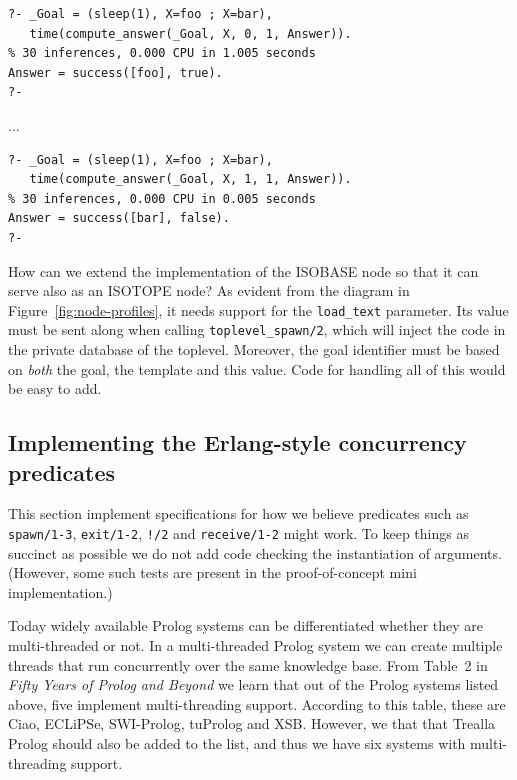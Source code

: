 \begin{verbatim}
?- _Goal = (sleep(1), X=foo ; X=bar),
   time(compute_answer(_Goal, X, 0, 1, Answer)).
% 30 inferences, 0.000 CPU in 1.005 seconds
Answer = success([foo], true).
?-
\end{verbatim}

\noindent ...

\begin{verbatim}
?- _Goal = (sleep(1), X=foo ; X=bar),
   time(compute_answer(_Goal, X, 1, 1, Answer)).
% 30 inferences, 0.000 CPU in 0.005 seconds
Answer = success([bar], false).
?-
\end{verbatim}


\noindent How can we extend the implementation of the ISOBASE node so that it can serve also as an ISOTOPE node? As evident from the diagram in Figure~\ref{fig:node-profiles}, it needs support for the \texttt{load\_text} parameter. Its value must be sent along when calling \texttt{toplevel\_spawn/2}, which will inject the code in the private database of the toplevel. Moreover, the goal identifier must be based on \textit{both} the goal, the template and this value. Code for handling all of this would be easy to add.


%
%



\subsection{Implementing the Erlang-style concurrency predicates}\label{sec:relation-node-implementation}

This section implement specifications for how we believe predicates such as \texttt{spawn/1-3}, \texttt{exit/1-2}, \texttt{!/2} and \texttt{receive/1-2} might work. To keep things as succinct as possible we do not add code checking the instantiation of arguments. (However, some such tests are present in the proof-of-concept mini implementation.)

Today widely available Prolog systems can be differentiated whether they are multi-threaded or not. In a multi-threaded Prolog system we can create multiple threads that run concurrently over the same knowledge base. From Table~2 in \textit{Fifty Years of Prolog and Beyond} we learn that out of the Prolog systems listed above, five implement multi-threading support. According to this table, these are Ciao, ECLiPSe, SWI-Prolog, tuProlog and XSB. However, we that that Trealla Prolog should also be added to the list, and thus we have six systems with multi-threading support. 


